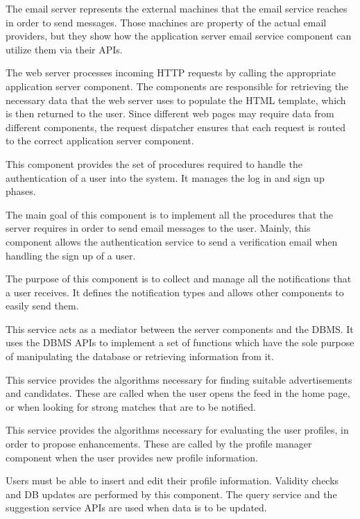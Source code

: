 The email server represents the external machines that the email service reaches in order to send messages.
Those machines are property of the actual email providers, but they show how the application server email service component can utilize them via their APIs.

The web server processes incoming HTTP requests by calling the appropriate application server component.
The components are responsible for retrieving the necessary data that the web server uses to populate the HTML template, which is then returned to the user.
Since different web pages may require data from different components, the request dispatcher ensures that each request is routed to the correct application server component.

This component provides the set of procedures required to handle the authentication of a user into the system.
It manages the log in and sign up phases.

The main goal of this component is to implement all the procedures that the server requires in order to send email messages to the user.
Mainly, this component allows the authentication service to send a verification email when handling the sign up of a user.

The purpose of this component is to collect and manage all the notifications that a user receives.
It defines the notification types and allows other components to easily send them.

This service acts as a mediator between the server components and the DBMS.
It uses the DBMS APIs to implement a set of functions which have the sole purpose of manipulating the database or retrieving information from it.

This service provides the algorithms necessary for finding suitable advertisements and candidates.
These are called when the user opens the feed in the home page, or when looking for strong matches that are to be notified.

This service provides the algorithms necessary for evaluating the user profiles, in order to propose enhancements.
These are called by the profile manager component when the user provides new profile information.

Users must be able to insert and edit their profile information.
Validity checks and DB updates are performed by this component.
The query service and the suggestion service APIs are used when data is to be updated.

